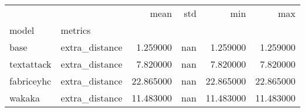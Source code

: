 \begin{tabular}{llrrrr}
 &  & mean & std & min & max \\
model & metrics &  &  &  &  \\
base & extra_distance & 1.259000 & nan & 1.259000 & 1.259000 \\
textattack & extra_distance & 7.820000 & nan & 7.820000 & 7.820000 \\
fabriceyhc & extra_distance & 22.865000 & nan & 22.865000 & 22.865000 \\
wakaka & extra_distance & 11.483000 & nan & 11.483000 & 11.483000 \\
\end{tabular}
